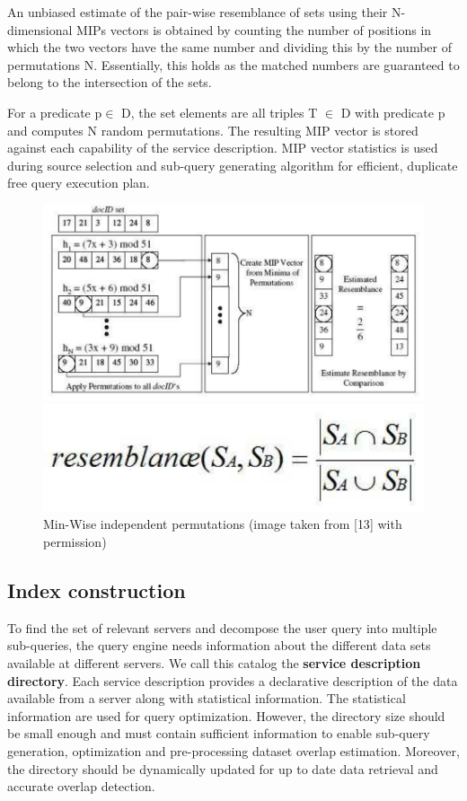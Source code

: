 \documentclass{sig-alternate}  %
\begin{document}
An unbiased estimate of the pair-wise resemblance of sets using their
N-dimensional MIPs vectors is obtained by counting the number of positions
in which the two vectors have the same number and dividing this by
the number of permutations N. Essentially, this holds as the matched
numbers are guaranteed to belong to the intersection of the sets.

For a predicate p$\in$ D, the set elements are all triples T $\in$
D with predicate p and computes N random permutations. The resulting
MIP vector is stored against each capability of the service description.
MIP vector statistics is used during source selection and sub-query
generating algorithm for efficient, duplicate free query execution
plan.

\begin{figure}
\begin{centering}
\includegraphics[scale=0.6]{6} 
\par\end{centering}

\centering{}\includegraphics[scale=0.4]{equ}\caption{Min-Wise independent permutations (image taken from {[}13{]} with
permission)}
\end{figure}


\subsection{Index construction}
To find the set of relevant servers and decompose the user query into
multiple sub-queries, the query engine needs information about the
different data sets available at different servers. We call this catalog
the \textbf{service description directory}. Each service description
provides a declarative description of the data available from a server
along with statistical information. The statistical information are
used for query optimization. However, the directory size should be
small enough and must contain sufficient information to enable sub-query
generation, optimization and pre-processing dataset overlap estimation.
Moreover, the directory should be dynamically updated for up to date
data retrieval and accurate overlap detection.
\end{document}
